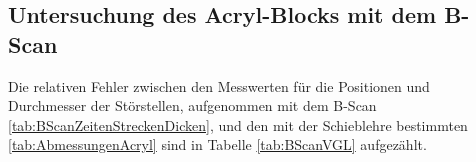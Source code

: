 \subsection{Untersuchung des Acryl-Blocks mit dem B-Scan}

Die relativen Fehler zwischen den Messwerten für die Positionen und Durchmesser
der Störstellen, aufgenommen mit dem B-Scan \ref{tab:BScanZeitenStreckenDicken},
und den mit der Schieblehre bestimmten \ref{tab:AbmessungenAcryl} sind in
Tabelle \ref{tab:BScanVGL} aufgezählt.
